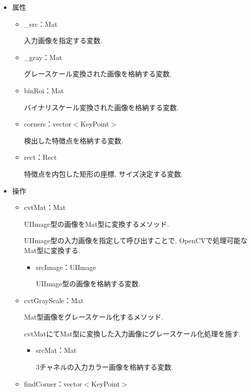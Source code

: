 \begin{itemize}
\item 属性

\begin{itemize}
\item \_src：Mat

入力画像を指定する変数.

\item \_gray：Mat

グレースケール変換された画像を格納する変数.

\item binRoi：Mat

バイナリスケール変換された画像を格納する変数.

\item corners：vector$<$KeyPoint$>$

検出した特徴点を格納する変数.

\item rect：Rect

特徴点を内包した矩形の座標, サイズ決定する変数.

\end{itemize}

\item 操作

\begin{itemize}
\item cvtMat：Mat

UIImage型の画像をMat型に変換するメソッド.

UIImage型の入力画像を指定して呼び出すことで, OpenCVで処理可能なMat型に変換する.

\begin{itemize}
\item srcImage：UIImage

UIImage型の画像を格納する変数.
\end{itemize}

\item cvtGrayScale：Mat

Mat型画像をグレースケール化するメソッド.

cvtMatにてMat型に変換した入力画像にグレースケール化処理を施す.

\begin{itemize}
\item srcMat：Mat

3チャネルの入力カラー画像を格納する変数.
\end{itemize}

\item findCorner：vector$<$KeyPoint$>$


\end{itemize}
\end{itemize}
